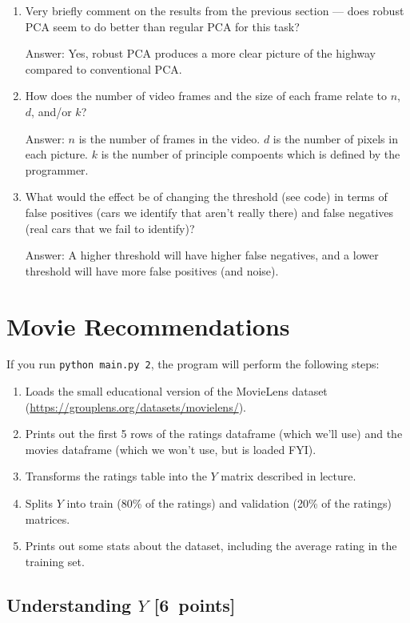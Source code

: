 \documentclass{article}
\newcommand{\gre}[1]{\textcolor{gre}{#1}}
\newcommand\ans[1]{\par\gre{Answer: #1}}
\newcommand\pts[1]{\textcolor{pointscolour}{[#1~points]}}
\begin{document}
\begin{enumerate}
	\item Very briefly comment on the results from the previous section --- does robust PCA seem to do better than regular PCA for this task?
    \ans{Yes, robust PCA produces a more clear picture of the highway compared to conventional PCA. }
	
    \item How does the number of video frames and the size of each frame relate to $n$, $d$, and/or $k$?
    \ans{$n$ is the number of frames in the video. $d$ is the number of pixels in each picture. $k$ is the number of principle compoents which is defined by the programmer.}
	
    \item What would the effect be of changing the threshold (see code) in terms of false positives (cars we identify that aren't really there) and false negatives (real cars that we fail to identify)?
    \ans{A higher threshold will have higher false negatives, and a lower threshold will have more false positives (and noise).}
\end{enumerate}

\newpage
\section{Movie Recommendations}

If you run \texttt{python main.py 2}, the program will perform the following steps:

\begin{enumerate}
\item Loads the small educational version of the MovieLens dataset (\url{https://grouplens.org/datasets/movielens/}).
\item Prints out the first 5 rows of the ratings dataframe (which we'll use) and the movies dataframe (which we won't use, but is loaded FYI).
\item Transforms the ratings table into the $Y$ matrix described in lecture.
\item Splits $Y$ into train (80\% of the ratings) and validation (20\% of the ratings) matrices.
\item Prints out some stats about the dataset, including the average rating in the training set.
\end{enumerate}

\subsection{Understanding $Y$ \pts{6}}
\end{document}
